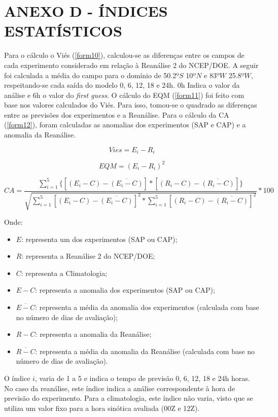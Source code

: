 \hypertarget{estilo:anexo}{}

\chapter{ANEXO D - ÍNDICES ESTATÍSTICOS}
\label{anexoD}

Para o cálculo o Viés (\autoref{form10}), calculou-se as diferenças entre os campos de cada experimento considerado em relação à Reanálise 2 do NCEP/DOE. A seguir foi calculada a média do campo para o domínio de 50.2$ºS$ 10$ºN$ e 83$ºW$ 25.8$ºW$, respeitando-se cada saída do modelo 0, 6, 12, 18 e 24h. 0h Indica o valor da análise e 6h o valor do \textit{first guess}. O cálculo do EQM (\autoref{form11}) foi feito com base nos valores calculados do Viés. Para isso, tomou-se o quadrado as diferenças entre as previsões dos experimentos e a Reanálise. Para o cálculo da CA (\autoref{form12}), foram calculadas as anomalias dos experimentos (SAP e CAP) e a anomalia da Reanálise.

\begin{equation}
Vies=E_{i}-R_{i}
\label{form10}
\end{equation}

\begin{equation}
EQM=(E_{i}-R_{i})^{2}
\label{form11}
\end{equation}

\begin{equation}
CA=\frac{\sum_{i=1}^{5}\{[(E_{i}-C)-\overline{(E_{i}-C)}]*[(R_{i}-C)-\overline{(R_{i}-C)}]\}}{\sqrt{\sum_{i=1}^{5}[(E_{i}-C)-\overline{(E_{i}-C)}]^{2}*\sum_{i=1}^{5}[(R_{i}-C)-\overline{(R_{i}-C)}]^{2}}}*100
\label{form12}
\end{equation}

Onde:

\begin{itemize}
\item $E$: representa um dos experimentos (SAP ou CAP);
\item $R$: representa a Reanálise 2 do NCEP/DOE;
\item $C$: representa a Climatologia;
\item $E-C$: representa a anomalia dos experimentos (SAP ou CAP);
\item $\overline{E-C}$: representa a média da anomalia dos experimentos (calculada com base no número de dias de avaliação);
\item $R-C$: representa a anomalia da Reanálise;
\item $\overline{R-C}$: representa a média da anomalia da Reanálise (calculada com base no número de dias de avaliação).
\end{itemize}

O índice $i$, varia de 1 a 5 e indica o tempo de previsão 0, 6, 12, 18 e 24h horas. No caso da reanálise, este índice indica a análise correspondente à hora de previsão do experimento. Para a climatologia, este índice não varia, visto que se utiliza um valor fixo para a hora sinótica avaliada (00Z e 12Z).
